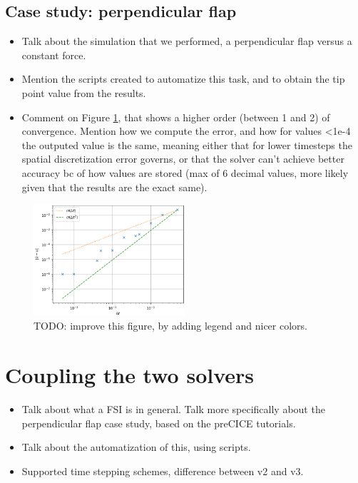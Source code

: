 \documentclass[
  english,        %
  font=times,     %
  onecolumn,      %
]{tumarticle}
\begin{document}
\subsection{Case study: perpendicular flap}
\begin{itemize}
\item Talk about the simulation that we performed, a perpendicular flap versus a constant force.
\item Mention the scripts created to automatize this task, and to obtain the tip point value from the results.
\item Comment on Figure \ref{fig:calculix_convergence}, that shows a higher order (between 1 and 2) of convergence. Mention how we compute the error, and how for values <1e-4 the outputed value is the same, meaning either that for lower timesteps the spatial discretization error governs, or that the solver can't achieve better accuracy bc of how values are stored (max of 6 decimal values, more likely given that the results are the exact same). 
\end{itemize}

\begin{figure}[!ht]
    \centering
    \includegraphics[width=0.5\textwidth]{resources/calculix_convergence_study.png}
    \caption{TODO: improve this figure, by adding legend and nicer colors.}
    \label{fig:calculix_convergence}
\end{figure}


\section{Coupling the two solvers}
\begin{itemize}
    \item Talk about what a FSI is in general. Talk more specifically about the perpendicular flap case study, based on the preCICE tutorials.
    \item Talk about the automatization of this, using scripts.
    \item Supported time stepping schemes, difference between v2 and v3.
\end{itemize}
\end{document}
